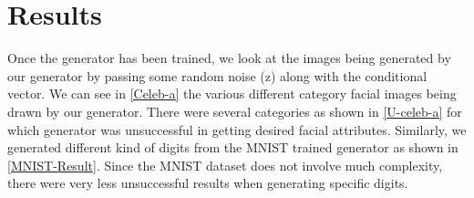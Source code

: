 \section{Results}

Once the generator has been trained, we look at the images being generated by our generator by passing some random noise (z) along with the conditional vector. We can see in \cref{Celeb-a} the various different category facial images being drawn by our generator. There were several categories as shown in \cref{U-celeb-a} for which generator was unsuccessful in getting desired facial attributes. Similarly, we generated different kind of digits from the MNIST trained generator as shown in \cref{MNIST-Result}. Since the MNIST dataset does not involve much complexity, there were very less unsuccessful results when generating specific digits.

  

